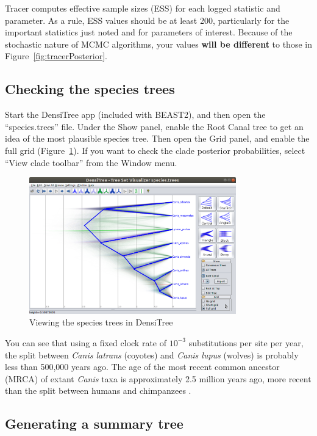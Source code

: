 \documentclass[12pt]{article}
\begin{document}
Tracer computes effective sample sizes (ESS) for each logged statistic and
parameter. As a rule, ESS values should be at least 200, particularly for
the important statistics just noted and for parameters of interest. Because of the stochastic
nature of MCMC algorithms, your values \textbf{will be different} to those in
Figure~\ref{fig:tracerPosterior}.

\subsection{Checking the species trees}
\label{subsec:checkTrees}

Start the DensiTree app (included with BEAST2), and then open the
``species.trees'' file. Under the Show panel, enable the Root Canal tree to
get an idea of the most plausible species tree. Then open the Grid panel, and
enable the full grid (Figure~\ref{fig:densitree}). If you want to check the
clade posterior probabilities, select ``View clade toolbar'' from the Window menu.

\begin{figure}[htb!]
\centering
\includegraphics[width=0.8\textwidth]{figures/densitree.png}
\caption
{Viewing the species trees in DensiTree}
\label{fig:densitree}
\end{figure}

You can see that using a fixed clock rate of $10^{-3}$ substitutions per site
per year, the split between \textit{Canis latrans} (coyotes) and \textit{Canis lupus}
(wolves) is probably less than 500,000 years ago. The age of the most
recent common ancestor (MRCA) of extant \textit{Canis} taxa is approximately 2.5 million
years ago, more recent than the split between humans and chimpanzees \citep{PradoMartinez2013}.

\subsection{Generating a summary tree}
\label{subsec:makeSummaryTree}
\end{document}
